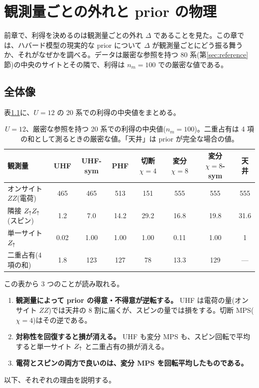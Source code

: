 \chapter{観測量ごとの外れと prior の物理}
\label{ch:priors}

前章で、利得を決めるのは観測量ごとの外れ $\Delta$ であることを見た。この章では、ハバード模型の現実的な prior について $\Delta$ が観測量ごとにどう振る舞うか、それがなぜかを調べる。データは厳密な参照を持つ 80 系(第\ref{sec:reference}節)の中央のサイトとその隣で、利得は $n_m=100$ での厳密な値である。

\section{全体像}

表\ref{tab:overview}に、$U=12$ の 20 系での利得の中央値をまとめる。

\begin{table}[t]
\centering\small
\caption{$U=12$、厳密な参照を持つ 20 系での利得の中央値($n_m=100$)。二重占有は 4 項の和として測るときの厳密な値。「天井」は prior が完全な場合の値。}
\label{tab:overview}
\begin{tabular}{@{}lccccccc@{}}
\toprule
観測量 & UHF & UHF-sym & PHF & 切断 $\chi{=}4$ & 変分 $\chi{=}8$ & 変分 $\chi{=}8$-sym & 天井 \\
\midrule
オンサイト $ZZ$(電荷) & 465 & 465 & 513 & 151 & 555 & 555 & 555 \\
隣接 $Z_\uparrow Z_\uparrow$(スピン) & 1.2 & 7.0 & 14.2 & 29.2 & 16.8 & 19.8 & 31.6 \\
単一サイト $Z_\uparrow$ & 0.02 & 1.00 & 1.00 & 1.00 & 0.11 & 1.00 & 1 \\
二重占有(4 項の和) & 1.8 & 123 & 127 & 78 & 13.3 & 129 & --- \\
\bottomrule
\end{tabular}
\end{table}

この表から 3 つのことが読み取れる。
\begin{enumerate}
  \item \textbf{観測量によって prior の得意・不得意が逆転する。} UHF は電荷の量(オンサイト $ZZ$)では天井の 8 割に届くが、スピンの量では損をする。切断 MPS($\chi=4$)はその逆である。
  \item \textbf{対称性を回復すると損が消える。} UHF も変分 MPS も、スピン回転で平均すると単一サイト $Z_\uparrow$ と二重占有の損が消える。
  \item \textbf{電荷とスピンの両方で良いのは、変分 MPS を回転平均したものである。}
\end{enumerate}
以下、それぞれの理由を説明する。

